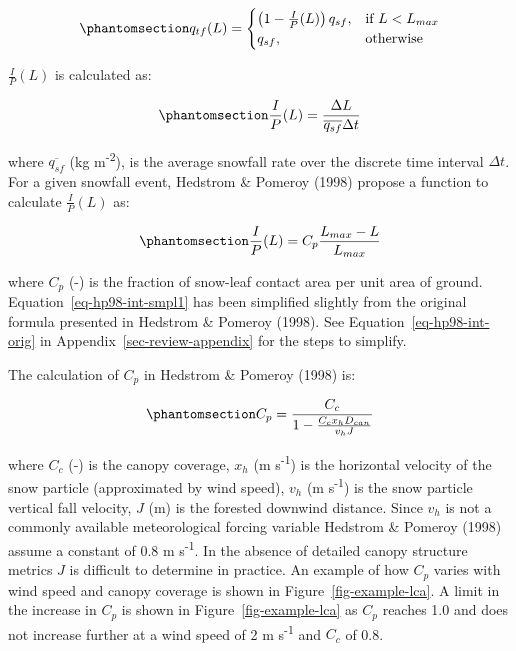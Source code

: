 \documentclass[
  letterpaper,
]{tex/uofsthesis-cs}
\begin{document}
\begin{equation}\phantomsection\label{eq-tf-ode}{
q_{tf}(L) = \begin{cases}
    \left(1-\frac{I}{P}(L)\right)q_{sf},& \text{if } L< L_{max}\\
    q_{sf},              & \text{otherwise}
\end{cases}
}\end{equation}

\(\frac{I}{P}(L)\) is calculated as:

\begin{equation}\phantomsection\label{eq-ip}{
\frac{I}{P}(L) = \frac{\Delta L}{\overline{q_{sf}} \Delta t} 
}\end{equation}

where \(\overline{q_{sf}}\) (kg m\textsuperscript{-2}), is the average
snowfall rate over the discrete time interval \(\Delta t\). For a given
snowfall event, Hedstrom \& Pomeroy (1998) propose a function to
calculate \(\frac{I}{P}(L)\) as:

\begin{equation}\phantomsection\label{eq-hp98-int-smpl1}{
\frac{I}{P}(L) = C_{p}\frac{L_{max}-L}{L_{max}}
}\end{equation}

where \(C_{p}\) (-) is the fraction of snow-leaf contact area per unit
area of ground. Equation~\ref{eq-hp98-int-smpl1} has been simplified
slightly from the original formula presented in Hedstrom \& Pomeroy
(1998). See Equation~\ref{eq-hp98-int-orig} in
Appendix~\ref{sec-review-appendix} for the steps to simplify.

The calculation of \(C_{p}\) in Hedstrom \& Pomeroy (1998) is:

\begin{equation}\phantomsection\label{eq-hp98-cp}{
C_{p} = \frac{C_c}{1-\frac{C_c x_h D_{can}}{v_h J}}
}\end{equation}

where \(C_c\) (-) is the canopy coverage, \(x_h\) (m
s\textsuperscript{-1}) is the horizontal velocity of the snow particle
(approximated by wind speed), \(v_h\) (m s\textsuperscript{-1}) is the
snow particle vertical fall velocity, \(J\) (m) is the forested downwind
distance. Since \(v_h\) is not a commonly available meteorological
forcing variable Hedstrom \& Pomeroy (1998) assume a constant of 0.8 m
s\textsuperscript{-1}. In the absence of detailed canopy structure
metrics \(J\) is difficult to determine in practice. An example of how
\(C_p\) varies with wind speed and canopy coverage is shown in
Figure~\ref{fig-example-lca}. A limit in the increase in \(C_p\) is
shown in Figure~\ref{fig-example-lca} as \(C_p\) reaches 1.0 and does
not increase further at a wind speed of 2 m s\textsuperscript{-1} and
\(C_c\) of 0.8.
\end{document}
